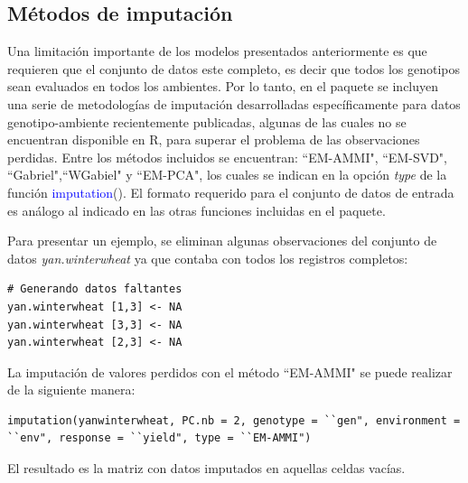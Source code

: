 \subsection{Métodos de imputación}
\label{subsec:metimp}

Una limitación importante de los modelos presentados anteriormente es que requieren que el conjunto de datos este completo, es decir que todos los genotipos sean evaluados en todos los ambientes. Por lo tanto, en el paquete se incluyen una serie de metodologías de imputación desarrolladas específicamente para datos genotipo-ambiente recientemente publicadas, algunas de las cuales no se encuentran disponible en R, para superar el problema de las observaciones perdidas. Entre los métodos incluidos se encuentran: ``EM-AMMI", ``EM-SVD", ``Gabriel",``WGabiel"  y ``EM-PCA", los cuales se indican en la opción \emph{type} de la función \textcolor{blue}{imputation}(). El formato requerido para el conjunto de datos de entrada es análogo al indicado en las otras funciones incluidas en el paquete. 

Para presentar un ejemplo, se eliminan algunas observaciones del conjunto de datos \emph{yan.winterwheat} ya que contaba con todos los registros completos:

\begin{tcolorbox}[skin=bicolor,
    colframe=aurometalsaurus,colback=backcolour,colbacklower=white,
    width=1\linewidth,
    height=0.15\linewidth,
    boxsep=-3mm]
\begin{lstlisting}
# Generando datos faltantes
yan.winterwheat [1,3] <- NA
yan.winterwheat [3,3] <- NA
yan.winterwheat [2,3] <- NA
\end{lstlisting}
\end{tcolorbox}

La imputación de valores perdidos con el método ``EM-AMMI" se puede realizar de la siguiente manera:

\begin{tcolorbox}[skin=bicolor,
    colframe=aurometalsaurus,colback=backcolour,colbacklower=white,
    width=1\linewidth,
    height=0.1\linewidth,
    boxsep=-3mm]
\begin{lstlisting}
imputation(yanwinterwheat, PC.nb = 2, genotype = ``gen", environment = ``env", response = ``yield", type = ``EM-AMMI")
\end{lstlisting}
\end{tcolorbox}

El resultado es la matriz con datos imputados en aquellas celdas vacías. 


